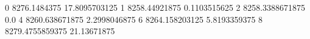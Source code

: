 0 8276.1484375 17.8095703125
1 8258.44921875 0.1103515625
2 8258.3388671875 0.0
4 8260.638671875 2.2998046875
6 8264.158203125 5.8193359375
8 8279.4755859375 21.13671875
